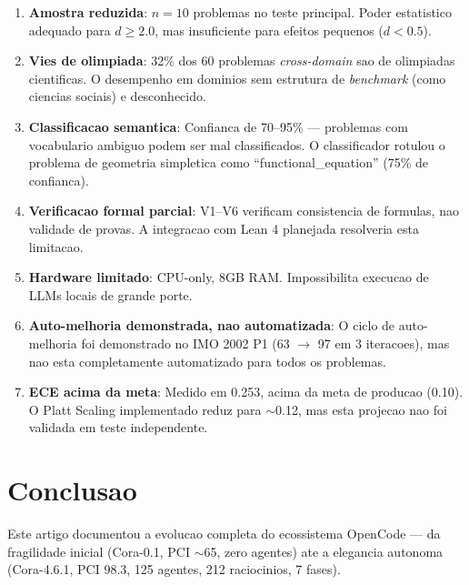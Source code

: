 \documentclass[5p]{elsarticle}
\begin{document}
\begin{enumerate}[label=\textbf{L\arabic*:}]
  \item \textbf{Amostra reduzida}: $n = 10$ problemas no teste principal.
        Poder estatistico adequado para $d \geq 2.0$, mas insuficiente para
        efeitos pequenos ($d < 0.5$).

  \item \textbf{Vies de olimpiada}: 32\% dos 60 problemas \textit{cross-domain}
        sao de olimpiadas cientificas. O desempenho em dominios sem estrutura
        de \textit{benchmark} (como ciencias sociais) e desconhecido.

  \item \textbf{Classificacao semantica}: Confianca de 70--95\% --- problemas
        com vocabulario ambiguo podem ser mal classificados. O classificador
        rotulou o problema de geometria simpletica como ``functional\_equation''
        (75\% de confianca).

  \item \textbf{Verificacao formal parcial}: V1--V6 verificam consistencia de
        formulas, nao validade de provas. A integracao com Lean 4 planejada
        resolveria esta limitacao.

  \item \textbf{Hardware limitado}: CPU-only, 8GB RAM. Impossibilita execucao
        de LLMs locais de grande porte.

  \item \textbf{Auto-melhoria demonstrada, nao automatizada}: O ciclo de
        auto-melhoria foi demonstrado no IMO 2002 P1 (63 $\to$ 97 em 3
        iteracoes), mas nao esta completamente automatizado para todos os
        problemas.

  \item \textbf{ECE acima da meta}: Medido em 0.253, acima da meta de producao
        (0.10). O Platt Scaling implementado reduz para $\sim$0.12, mas esta
        projecao nao foi validada em teste independente.
\end{enumerate}

\section{Conclusao}

Este artigo documentou a evolucao completa do ecossistema OpenCode --- da
fragilidade inicial (Cora-0.1, PCI $\sim$65, zero agentes) ate a elegancia
autonoma (Cora-4.6.1, PCI 98.3, 125 agentes, 212 raciocinios, 7 fases).
\end{document}

